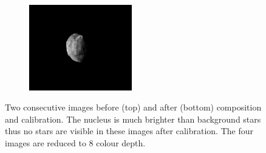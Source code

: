 \begin{figure}[htb]
\begin{subfigure}[b]{\textwidth}
        \includegraphics[width=0.49\textwidth]{doc/thesis/0_figures/rendering_lighting/Inst_2017-08-15T115859-288000.png}
    \end{subfigure}
    \caption{Two consecutive images before (top) and after (bottom) composition and calibration. The nucleus is much brighter than background stars thus no stars are visible in these images after calibration. The four images are reduced to \SI{8}{\bit} colour depth.}
    \label{fig:composition_before_after}
\end{figure}

